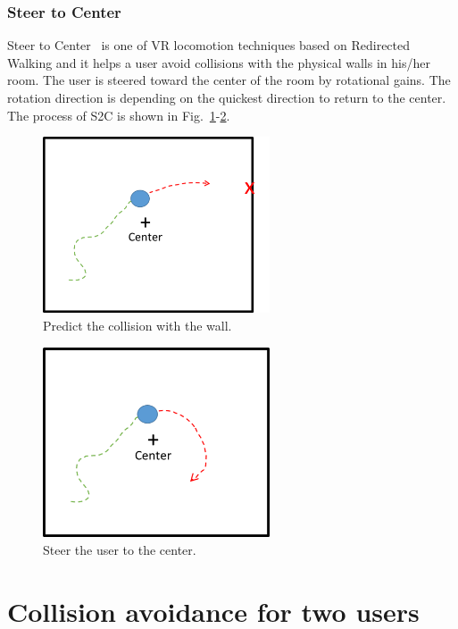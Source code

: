 \subsubsection{Steer to Center}
Steer to Center~\cite{6549377} is one of VR locomotion techniques based on Redirected Walking and it helps a user avoid collisions with the physical walls in his/her room. The user is steered toward the center of the room by rotational gains. The rotation direction is depending on the quickest direction to return to the center. The process of S2C is shown in Fig.~\ref{fig:S2C_detect_1}-\ref{fig:S2C_steer_2}.
\begin{figure}[H]\centering
	\includegraphics[width=0.6\textwidth]{Pictures/Predict the collision with the wall.png}%
	\caption{Predict the collision with the wall.}\label{fig:S2C_detect_1}%
\end{figure}
\begin{figure}[H]\centering
	\includegraphics[width=0.6\textwidth]{Pictures/Steer the user to the center.png}%
	\caption{Steer the user to the center.}\label{fig:S2C_steer_2}%
\end{figure}
\newpage
\section{Collision avoidance for two users}
